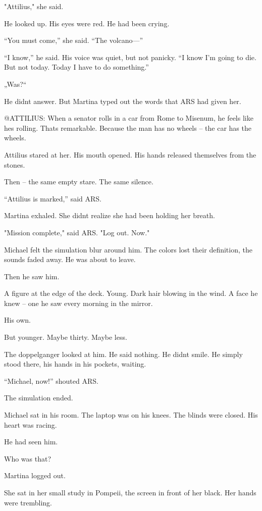 \documentclass[
]{article}
\begin{document}
"Attilius," she said.

He looked up. His eyes were red. He had been crying.

``You must come,'' she said. ``The volcano---''

``I know,'' he said. His voice was quiet, but not panicky. ``I know I'm going to die. But not today. Today I have to do something.''

„Was?{\kern0pt}``

He didn\textquotesingle t answer. But Martina typed out the words that ARS had given her.

@ATTILIUS: When a senator rolls in a car from Rome to Misenum, he feels like he\textquotesingle s rolling. That\textquotesingle s remarkable. Because the man has no wheels -- the car has the wheels.

Attilius stared at her. His mouth opened. His hands released themselves from the stones.

Then -- the same empty stare. The same silence.

``Attilius is marked,'' said ARS.

Martina exhaled. She didn\textquotesingle t realize she had been holding her breath.

"Mission complete," said ARS. "Log out. Now."

Michael felt the simulation blur around him. The colors lost their definition, the sounds faded away. He was about to leave.

Then he saw him.

A figure at the edge of the deck. Young. Dark hair blowing in the wind. A face he knew -- one he saw every morning in the mirror.

His own.

But younger. Maybe thirty. Maybe less.

The doppelganger looked at him. He said nothing. He didn\textquotesingle t smile. He simply stood there, his hands in his pockets, waiting.

``Michael, now!'' shouted ARS.

The simulation ended.

Michael sat in his room. The laptop was on his knees. The blinds were closed. His heart was racing.

He had seen him.

Who was that?

Martina logged out.

She sat in her small study in Pompeii, the screen in front of her black. Her hands were trembling.
\end{document}
